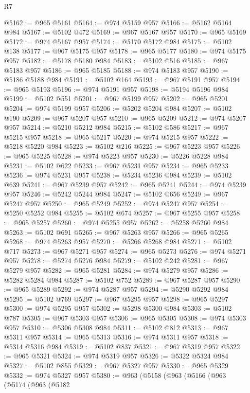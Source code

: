 \begin{lexlean}{R7}
\begin{coremodule}
@5162 := @965 @5161
@5164 := @974 @5159 @957
@5166 := @5162 @5164 @984
@5167 := @5102 @472
@5169 := @967 @5167 @957
@5170 := @965 @5169
@5172 := @974 @5167 @957
@5174 := @5170 @5172 @984
@5175 := @5102 @138
@5177 := @967 @5175 @957
@5178 := @965 @5177
@5180 := @974 @5175 @957
@5182 := @5178 @5180 @984
@5183 := @5102 @516
@5185 := @967 @5183 @957
@5186 := @965 @5185
@5188 := @974 @5183 @957
@5190 := @5186 @5188 @984
@5191 := @5102 @164
@5193 := @967 @5191 @957
@5194 := @965 @5193
@5196 := @974 @5191 @957
@5198 := @5194 @5196 @984
@5199 := @5102 @551
@5201 := @967 @5199 @957
@5202 := @965 @5201
@5204 := @974 @5199 @957
@5206 := @5202 @5204 @984
@5207 := @5102 @190
@5209 := @967 @5207 @957
@5210 := @965 @5209
@5212 := @974 @5207 @957
@5214 := @5210 @5212 @984
@5215 := @5102 @586
@5217 := @967 @5215 @957
@5218 := @965 @5217
@5220 := @974 @5215 @957
@5222 := @5218 @5220 @984
@5223 := @5102 @216
@5225 := @967 @5223 @957
@5226 := @965 @5225
@5228 := @974 @5223 @957
@5230 := @5226 @5228 @984
@5231 := @5102 @622
@5233 := @967 @5231 @957
@5234 := @965 @5233
@5236 := @974 @5231 @957
@5238 := @5234 @5236 @984
@5239 := @5102 @639
@5241 := @967 @5239 @957
@5242 := @965 @5241
@5244 := @974 @5239 @957
@5246 := @5242 @5244 @984
@5247 := @5102 @656
@5249 := @967 @5247 @957
@5250 := @965 @5249
@5252 := @974 @5247 @957
@5254 := @5250 @5252 @984
@5255 := @5102 @674
@5257 := @967 @5255 @957
@5258 := @965 @5257
@5260 := @974 @5255 @957
@5262 := @5258 @5260 @984
@5263 := @5102 @691
@5265 := @967 @5263 @957
@5266 := @965 @5265
@5268 := @974 @5263 @957
@5270 := @5266 @5268 @984
@5271 := @5102 @717
@5273 := @967 @5271 @957
@5274 := @965 @5273
@5276 := @974 @5271 @957
@5278 := @5274 @5276 @984
@5279 := @5102 @242
@5281 := @967 @5279 @957
@5282 := @965 @5281
@5284 := @974 @5279 @957
@5286 := @5282 @5284 @984
@5287 := @5102 @752
@5289 := @967 @5287 @957
@5290 := @965 @5289
@5292 := @974 @5287 @957
@5294 := @5290 @5292 @984
@5295 := @5102 @769
@5297 := @967 @5295 @957
@5298 := @965 @5297
@5300 := @974 @5295 @957
@5302 := @5298 @5300 @984
@5303 := @5102 @787
@5305 := @967 @5303 @957
@5306 := @965 @5305
@5308 := @974 @5303 @957
@5310 := @5306 @5308 @984
@5311 := @5102 @812
@5313 := @967 @5311 @957
@5314 := @965 @5313
@5316 := @974 @5311 @957
@5318 := @5314 @5316 @984
@5319 := @5102 @837
@5321 := @967 @5319 @957
@5322 := @965 @5321
@5324 := @974 @5319 @957
@5326 := @5322 @5324 @984
@5327 := @5102 @855
@5329 := @967 @5327 @957
@5330 := @965 @5329
@5332 := @974 @5327 @957
@5380 := @963
    (@5158
      (@963
        (@5166
          (@963
            (@5174
              (@963
                (@5182

\end{coremodule}
\end{lexlean}
